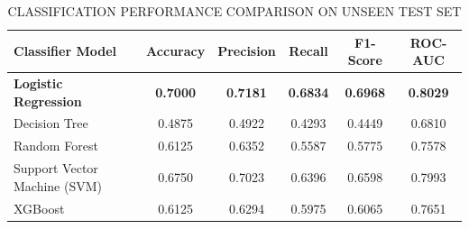 \begin{table}[htbp]
\centering
\caption{\uppercase{Classification Performance Comparison on Unseen Test Set}}
\label{tab:model_comparison}
\begin{tabular}{lccccc}
\hline
\textbf{Classifier Model} & \textbf{Accuracy} & \textbf{Precision} & \textbf{Recall} & \textbf{F1-Score} & \textbf{ROC-AUC} \\
\hline
\textbf{Logistic Regression} & \textbf{0.7000} & \textbf{0.7181} & \textbf{0.6834} & \textbf{0.6968} & \textbf{0.8029} \\
Decision Tree & 0.4875 & 0.4922 & 0.4293 & 0.4449 & 0.6810 \\
Random Forest & 0.6125 & 0.6352 & 0.5587 & 0.5775 & 0.7578 \\
Support Vector Machine (SVM) & 0.6750 & 0.7023 & 0.6396 & 0.6598 & 0.7993 \\
XGBoost & 0.6125 & 0.6294 & 0.5975 & 0.6065 & 0.7651 \\
\hline
\end{tabular}
\end{table}
